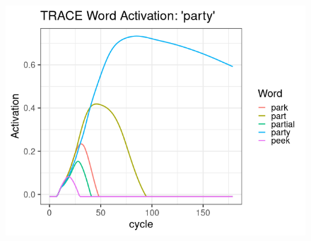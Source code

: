 \documentclass{beamer}
\newcommand{\vp}{\vspace{2mm}}
\providecommand{\cn}[1]{\textcolor{blue}{#1}}
\begin{document}
%
%
%
%
%
%
%

\begin{frame}
\begin{figure}
\centering
\includegraphics[scale=0.5]{img/trace_plot_reg.png}
\end{figure}
\end{frame}
\end{document}
